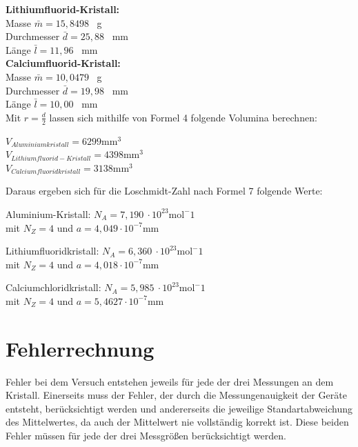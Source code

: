 \documentclass[12pt,a4paper,titlepage,headinclude,bibtotoc]{scrartcl}
\begin{document}
\vspace{3mm}
\textbf{Lithiumfluorid-Kristall:}\\
Masse $\bar{m}=15,8498$ \ g \\
Durchmesser $\bar{d}=25,88$ \ mm \\
Länge $\bar{l}=11,96$ \ mm\\

\vspace{3mm}
\textbf{Calciumfluorid-Kristall:}\\
Masse $\bar{m}=10,0479$ \ g \\
Durchmesser $\bar{d}=19,98$ \ mm \\
Länge $\bar{l}=10,00$ \ mm\\

Mit $r=\frac{d}{2}$ lassen sich mithilfe von Formel 4 folgende Volumina berechnen:

\vspace{3mm}
$V_{Aluminiumkristall} = 6299 \mathrm{mm^3}$\\
$V_{Lithiumfluorid-Kristall} =4398 \mathrm{mm^3}$\\
$V_{Calciumfluoridkristall} = 3138 \mathrm{mm^3}$\\

\vspace{3mm}

Daraus ergeben sich für die Loschmidt-Zahl nach Formel 7 folgende Werte:
\vspace{3mm}

Aluminium-Kristall: \qquad $N_A = 7,190 \ \cdot 10^{23} \mathrm{mol^-1}$\\
mit $N_Z =4$ und $a=4,049\cdot 10^{-7} \mathrm{mm}$\\
\vspace{3mm}

Lithiumfluoridkristall: \qquad $N_A = 6,360 \ \cdot 10^{23} \mathrm{mol^-1}$\\
mit $N_Z =4$ und $a=4,018\cdot 10^{-7} \mathrm{mm}$\\
\vspace{3mm}

Calciumchloridkristall: \qquad $N_A = 5,985 \ \cdot 10^{23} \mathrm{mol^-1}$\\
mit $N_Z =4$ und $a=5,4627\cdot 10^{-7} \mathrm{mm}$\\
\vspace{3mm}


\section{Fehlerrechnung}
Fehler bei dem Versuch entstehen jeweils für jede der drei Messungen an dem Kristall. Einerseits muss der Fehler, der durch die Messungenauigkeit der Geräte entsteht, berücksichtigt werden und andererseits die jeweilige Standartabweichung des Mittelwertes, da auch der Mittelwert nie vollständig korrekt ist. Diese beiden Fehler müssen für jede der drei Messgrößen berücksichtigt werden.
\end{document}
